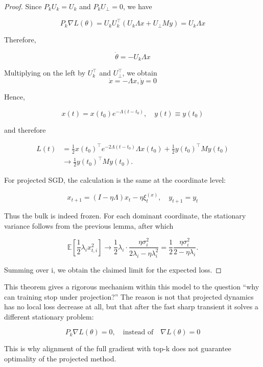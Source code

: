 \documentclass[conference]{IEEEtran}
\begin{document}
\begin{proof}

    Since $P_kU_k = U_k$ and $P_kU_\bot = 0$, we have

    \[
    P_k\nabla L(\theta) = U_kU_k^\top(U_k\Lambda x + U_\bot My) = U_k\Lambda x
    \]

    Therefore,

    \[
    \dot \theta = - U_k\Lambda x
    \]

    Multiplying on the left by $U_k^\top$ and $U_\bot^\top$, we obtain
    \[
    \dot x = -\Lambda x, \dot y =0
    \]
    
    Hence,
    
    \[
    x(t) = x(t_0)e^{-\Lambda (t-t_0)}, \quad y(t) \equiv y(t_0)
    \]

    and therefore

    \[
\begin{aligned}
L(t)
&=
\frac{1}{2}x(t_0)^\top e^{-2\Lambda (t-t_0)}
\Lambda x(t_0)
+
\frac{1}{2}y(t_0)^\top M y(t_0) \\
&\to
\frac{1}{2}y(t_0)^\top M y(t_0).
\end{aligned}
\]

    For projected SGD, the calculation is the same at the coordinate level:

    \[
    x_{t+1} = (I-\eta\Lambda)x_t - \eta \xi_t^{(x)}, \quad y_{t+1} = y_t
    \]

    Thus the bulk is indeed frozen. For each dominant coordinate, the stationary variance follows from the previous lemma, after which

    \[
    \mathbb E\left[\frac{1}{2}\lambda_i x_{t,i}^2\right]\to\frac{1}{2}\lambda_i\cdot\frac{\eta\sigma_i^2}{2\lambda_i-\eta\lambda_i^2}=\frac{1}{2}\frac{\eta\sigma_i^2}{2-\eta\lambda_i}.
    \]

    Summing over i, we obtain the claimed limit for the expected loss.
    
\end{proof}


This theorem gives a rigorous mechanism within this model to the question “why can training stop under projection?” The reason is not that projected dynamics has no local loss decrease at all, but that after the fast sharp transient it solves a different stationary problem:

\[
P_k\nabla L(\theta) = 0, \quad \text{instead of}\quad \nabla L(\theta) = 0
\]

This is why alignment of the full gradient with top-k does not guarantee optimality of the projected method.
\end{document}
